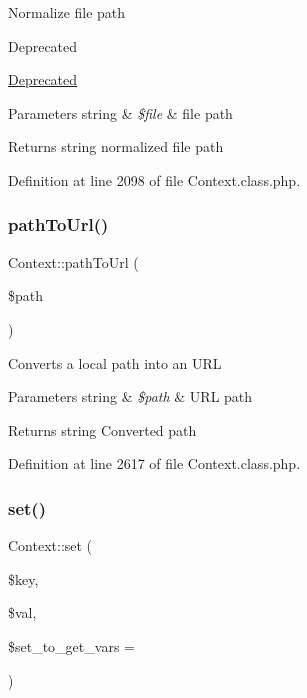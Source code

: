 Normalize file path

\begin{DoxyRefDesc}{Deprecated}
\item[\hyperlink{deprecated__deprecated000002}{Deprecated}]\end{DoxyRefDesc}

\begin{DoxyParams}[1]{Parameters}
string & {\em \$file} & file path \\
\hline
\end{DoxyParams}
\begin{DoxyReturn}{Returns}
string normalized file path 
\end{DoxyReturn}


Definition at line 2098 of file Context.\+class.\+php.

\mbox{\label{classContext_a6012ceb6e62fc99b0e2b24e475ba4da7}} 
\subsubsection{\texorpdfstring{path\+To\+Url()}{pathToUrl()}}
{\footnotesize\ttfamily Context\+::path\+To\+Url (\begin{DoxyParamCaption}\item[{}]{\$path }\end{DoxyParamCaption})}

Converts a local path into an U\+RL


\begin{DoxyParams}[1]{Parameters}
string & {\em \$path} & U\+RL path \\
\hline
\end{DoxyParams}
\begin{DoxyReturn}{Returns}
string Converted path 
\end{DoxyReturn}


Definition at line 2617 of file Context.\+class.\+php.

\mbox{\label{classContext_a9f79aa7aecf2e4d8006e517844523fc2}} 
\subsubsection{\texorpdfstring{set()}{set()}}
{\footnotesize\ttfamily Context\+::set (\begin{DoxyParamCaption}\item[{}]{\$key,  }\item[{}]{\$val,  }\item[{}]{\$set\+\_\+to\+\_\+get\+\_\+vars = {} }\end{DoxyParamCaption})}

